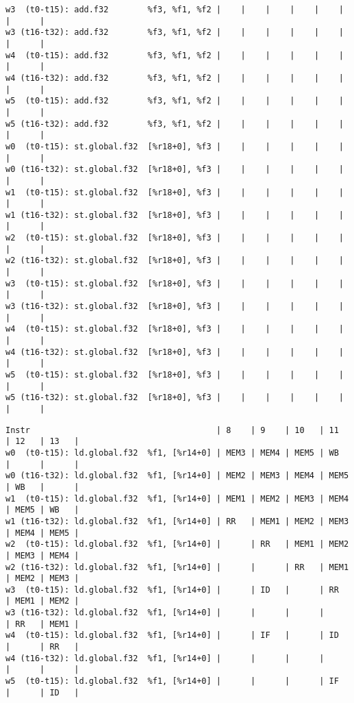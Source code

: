 \documentclass[11pt]{article}
\begin{document}
\begin{Answer}
\begin{verbatim}
w3  (t0-t15): add.f32        %f3, %f1, %f2 |    |    |    |    |    |      |      |
w3 (t16-t32): add.f32        %f3, %f1, %f2 |    |    |    |    |    |      |      |
w4  (t0-t15): add.f32        %f3, %f1, %f2 |    |    |    |    |    |      |      |
w4 (t16-t32): add.f32        %f3, %f1, %f2 |    |    |    |    |    |      |      |
w5  (t0-t15): add.f32        %f3, %f1, %f2 |    |    |    |    |    |      |      |
w5 (t16-t32): add.f32        %f3, %f1, %f2 |    |    |    |    |    |      |      |
w0  (t0-t15): st.global.f32  [%r18+0], %f3 |    |    |    |    |    |      |      |
w0 (t16-t32): st.global.f32  [%r18+0], %f3 |    |    |    |    |    |      |      |
w1  (t0-t15): st.global.f32  [%r18+0], %f3 |    |    |    |    |    |      |      |
w1 (t16-t32): st.global.f32  [%r18+0], %f3 |    |    |    |    |    |      |      |
w2  (t0-t15): st.global.f32  [%r18+0], %f3 |    |    |    |    |    |      |      |
w2 (t16-t32): st.global.f32  [%r18+0], %f3 |    |    |    |    |    |      |      |
w3  (t0-t15): st.global.f32  [%r18+0], %f3 |    |    |    |    |    |      |      |
w3 (t16-t32): st.global.f32  [%r18+0], %f3 |    |    |    |    |    |      |      |
w4  (t0-t15): st.global.f32  [%r18+0], %f3 |    |    |    |    |    |      |      |
w4 (t16-t32): st.global.f32  [%r18+0], %f3 |    |    |    |    |    |      |      |
w5  (t0-t15): st.global.f32  [%r18+0], %f3 |    |    |    |    |    |      |      |
w5 (t16-t32): st.global.f32  [%r18+0], %f3 |    |    |    |    |    |      |      |
\end{verbatim}
	\newpage
	\begin{verbatim}
Instr                                      | 8    | 9    | 10   | 11   | 12   | 13   |
w0  (t0-t15): ld.global.f32  %f1, [%r14+0] | MEM3 | MEM4 | MEM5 | WB   |      |      |
w0 (t16-t32): ld.global.f32  %f1, [%r14+0] | MEM2 | MEM3 | MEM4 | MEM5 | WB   |      |
w1  (t0-t15): ld.global.f32  %f1, [%r14+0] | MEM1 | MEM2 | MEM3 | MEM4 | MEM5 | WB   |
w1 (t16-t32): ld.global.f32  %f1, [%r14+0] | RR   | MEM1 | MEM2 | MEM3 | MEM4 | MEM5 |
w2  (t0-t15): ld.global.f32  %f1, [%r14+0] |      | RR   | MEM1 | MEM2 | MEM3 | MEM4 |
w2 (t16-t32): ld.global.f32  %f1, [%r14+0] |      |      | RR   | MEM1 | MEM2 | MEM3 |
w3  (t0-t15): ld.global.f32  %f1, [%r14+0] |      | ID   |      | RR   | MEM1 | MEM2 |
w3 (t16-t32): ld.global.f32  %f1, [%r14+0] |      |      |      |      | RR   | MEM1 |
w4  (t0-t15): ld.global.f32  %f1, [%r14+0] |      | IF   |      | ID   |      | RR   |
w4 (t16-t32): ld.global.f32  %f1, [%r14+0] |      |      |      |      |      |      |
w5  (t0-t15): ld.global.f32  %f1, [%r14+0] |      |      |      | IF   |      | ID   |

\end{verbatim}
\end{Answer}
\end{document}
